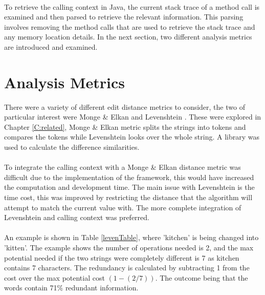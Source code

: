 \paragraph{}
To retrieve the calling context in Java, the current stack trace of a method call is examined and then parsed to retrieve the relevant information. This parsing involves removing the method calls that are used to retrieve the stack trace and any memory location details.  In the next section, two different analysis metrics are introduced and examined.

\section{Analysis Metrics}
\label{S:metrics}

There were a variety of different edit distance metrics to consider, the two of particular interest were Monge \& Elkan \cite{monge1997efficient} and Levenshtein \cite{levenshtein1966binary}. These were explored in Chapter \ref{C:related}, Monge \& Elkan metric splits the strings into tokens and compares the tokens while Levenshtein looks over the whole string. A library was used to calculate the difference similarities.
\paragraph{}
To integrate the calling context with a Monge \& Elkan distance metric was difficult due to the implementation of the framework, this would have increased the computation and development time. The main issue with Levenshtein is the time cost, this was improved by restricting the distance that the algorithm will attempt to match the current value with. The more complete integration of Levenshtein and calling context was preferred. 
\paragraph{}
An example is shown in Table \ref{levenTable}, where 'kitchen' is being changed into 'kitten'. The example shows the number of operations needed is 2, and the max potential needed if the two strings were completely different is 7 as kitchen contains 7 characters. The redundancy is calculated by subtracting 1 from the cost over the max potential cost $(1 - (2/7)) $. The outcome being that the words contain 71\% redundant information. 

